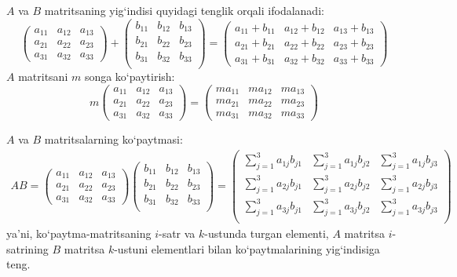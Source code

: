 $A$ va $B$ matritsaning yig`indisi quyidagi tenglik orqali ifodalanadi:
$$\begin{pmatrix}
	a_{11}&a_{12}&a_{13}\\
	a_{21}&a_{22}&a_{23}\\
	a_{31}&a_{32}&a_{33}
\end{pmatrix}
	+\begin{pmatrix}
		b_{11}&b_{12}&b_{13}\\
		b_{21}&b_{22}&b_{23}\\
		b_{31}&b_{32}&b_{33}\\
	\end{pmatrix}=\begin{pmatrix}
	a_{11}+b_{11}&a_{12}+b_{12}&a_{13}+b_{13}\\
	a_{21}+b_{21}&a_{22}+b_{22}&a_{23}+b_{23}\\
	a_{31}+b_{31}&a_{32}+b_{32}&a_{33}+b_{33}
\end{pmatrix}
$$
$A$ matritsani $m$ songa ko`paytirish:
$$m\begin{pmatrix}
	a_{11}&a_{12}&a_{13}\\
	a_{21}&a_{22}&a_{23}\\
	a_{31}&a_{32}&a_{33}
\end{pmatrix}=\begin{pmatrix}
ma_{11}&ma_{12}&ma_{13}\\
ma_{21}&ma_{22}&ma_{23}\\
ma_{31}&ma_{32}&ma_{33}
\end{pmatrix}$$

$A$ va $B$ matritsalarning ko`paytmasi:
\begin{multline*}
	AB=\begin{pmatrix}
		a_{11}&a_{12}&a_{13}\\
		a_{21}&a_{22}&a_{23}\\
		a_{31}&a_{32}&a_{33}
	\end{pmatrix}\begin{pmatrix}
		b_{11}&b_{12}&b_{13}\\
	b_{21}&b_{22}&b_{23}\\
	b_{31}&b_{32}&b_{33}\\
\end{pmatrix}
=\begin{pmatrix}
	\sum\limits_{j=1}^{3}a_{1j}b_{j1}&\sum\limits_{j=1}^{3}a_{1j}b_{j2}&\sum\limits_{j=1}^{3}a_{1j}b_{j3}\\
	\sum\limits_{j=1}^{3}a_{2j}b_{j1}&\sum\limits_{j=1}^{3}a_{2j}b_{j2}&\sum\limits_{j=1}^{3}a_{2j}b_{j3}\\
	\sum\limits_{j=1}^{3}a_{3j}b_{j1}&\sum\limits_{j=1}^{3}a_{3j}b_{j2}&\sum\limits_{j=1}^{3}a_{3j}b_{j3}\\
\end{pmatrix}
\end{multline*}
ya'ni, ko`paytma-matritsaning $i$-satr va $k$-ustunda turgan elementi, $A$ matritsa $i$-satrining $B$ matritsa $k$-ustuni elementlari bilan ko`paytmalarining yig`indisiga teng.

